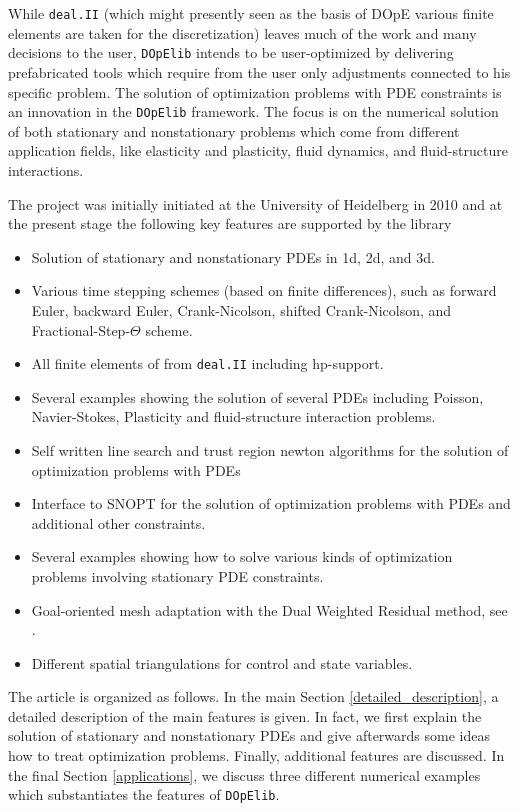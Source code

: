 \documentclass[prodmode,acmtoms]{acmsmall}
\numberwithin{equation}{section}
\newcommand{\deal}{\texttt{deal.II}}
\newcommand{\dope}{\texttt{DOpElib}}
\begin{document}
While \deal{} (which might presently seen as the basis of DOpE  
various finite elements are taken for the discretization) 
leaves much of the work and many
decisions to the user, \dope{} intends to be user-optimized by delivering
prefabricated tools which require from the user only adjustments connected
to his specific problem. The solution of optimization problems with PDE
constraints is an innovation in the \dope{} framework.
The focus is on the numerical solution of both stationary and nonstationary
problems which come from different application fields, like elasticity and
plasticity, fluid dynamics, and fluid-structure interactions.

The project was initially initiated at the University of Heidelberg in 2010 and  
at the present stage the following key features are supported by the library
\begin{itemize}
\item Solution of stationary and nonstationary PDEs in 1d, 2d, and 3d.
\item Various time stepping schemes (based on finite differences), 
  such as forward Euler, backward Euler,
  Crank-Nicolson, shifted Crank-Nicolson, and Fractional-Step-$\Theta$ scheme.
\item All finite elements of from \deal{} including hp-support.
\item Several examples showing the solution of several PDEs including
   Poisson, Navier-Stokes, Plasticity and fluid-structure interaction problems. 
\item Self written line search and trust region newton algorithms for the 
   solution of optimization problems with PDEs \cite{NoWr00}
\item Interface to SNOPT for the solution of optimization problems with PDEs and
  additional other constraints.
\item Several examples showing how to solve various kinds of optimization problems
  involving stationary PDE constraints.
\item Goal-oriented mesh adaptation with the Dual Weighted Residual method, see \cite{BR03}.
\item Different spatial triangulations for control and state variables.
\end{itemize}

The article is organized as follows. In the main Section
\ref{detailed_description}, a detailed description of 
the main features is given. In fact, we first explain the solution 
of stationary and nonstationary PDEs and give afterwards some 
ideas how to treat optimization problems. Finally, 
additional features are discussed. In the final Section
\ref{applications}, we discuss three different numerical 
examples which substantiates the features of \dope{}. 
\end{document}
